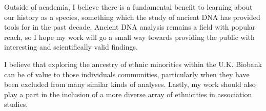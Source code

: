 Outside of academia, I believe there is a fundamental benefit to learning about our history as a species, something which the study of ancient DNA has provided tools for in the past decade. Ancient DNA analysis remains a field with popular reach, so I hope my work will go a small way towards providing the public with interesting and scientifically valid findings.

I believe that exploring the ancestry of ethnic minorities within the U.K. Biobank can be of value to those individuals communities, particularly when they have been excluded from many similar kinds of analyses. Lastly, my work should also play a part in the inclusion of a more diverse array of ethnicities in association studies.  

\setcounter{tocdepth}{2} 

\tableofcontents



